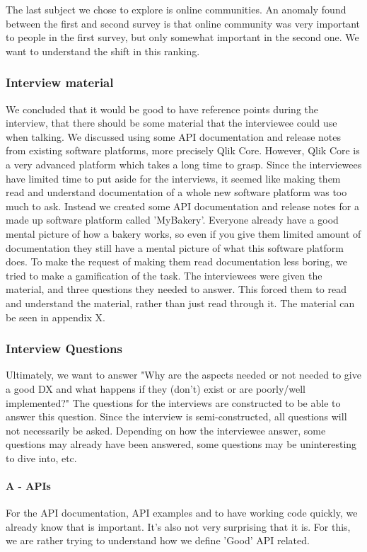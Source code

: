 \documentclass{article}
\begin{document}
The last subject we chose to explore is online communities. An anomaly found
between the first and second survey is that online community was very important
to people in the first survey, but only somewhat important in the second one.
We want to understand the shift in this ranking.

\subsubsection{Interview material}
We concluded that it would be good to have reference points during the interview,
that there should be some material that the interviewee could use when talking.
We discussed using some API documentation and release notes from existing software platforms,
more precisely Qlik Core. However, Qlik Core is a very advanced platform which takes a long time
to grasp. Since the interviewees have limited time to put aside for the interviews, it seemed
like making them read and understand documentation of a whole new software platform was too much to ask.
Instead we created some API documentation and release notes for a made up software platform
called 'MyBakery'. Everyone already have a good mental picture of how a bakery works,
so even if you give them limited amount of documentation they still have a mental picture
of what this software platform does. To make the request of making them read documentation less boring,
we tried to make a gamification of the task. The interviewees were given the material, and
three questions they needed to answer. This forced them to read and understand the material, rather
than just read through it. The material can be seen in appendix X.

\subsubsection{Interview Questions}

Ultimately, we want to answer "Why are the aspects needed or not needed
to give a good DX and what happens if they (don’t) exist or are poorly/well implemented?"
The questions for the interviews are constructed to be able to answer this question.
Since the interview is semi-constructed, all questions will not necessarily be asked.
Depending on how the interviewee answer, some questions may already have been answered,
some questions may be uninteresting to dive into, etc.
\paragraph{A - APIs}
For the API documentation, API examples and to have working code quickly, we
already know that is important. It's also not very surprising that it is.
For this, we are rather trying to understand how we define 'Good' API related.
\end{document}
